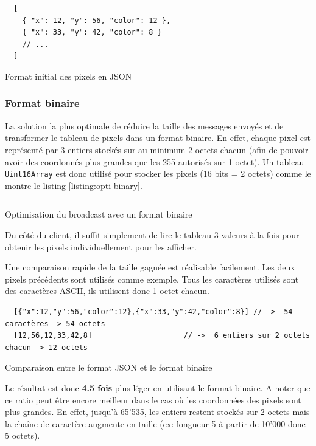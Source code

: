\begin{listing}[H]
  \begin{verbatim}
  [
    { "x": 12, "y": 56, "color": 12 },
    { "x": 33, "y": 42, "color": 8 }
    // ...
  ]
\end{verbatim}
  \caption{Format initial des pixels en JSON}
  \label{listing:pixels-initial-json-format}
\end{listing}

\subsubsection{Format binaire}

La solution la plus optimale de réduire la taille des messages envoyés et de transformer le tableau de pixels dans un format binaire. En effet, chaque pixel est représenté par 3 entiers stockés sur au minimum 2 octets chacun (afin de pouvoir avoir des coordonnés plus grandes que les 255 autorisés sur 1 octet). Un tableau \texttt{Uint16Array} est donc utilisé pour stocker les pixels (16 bits = 2 octets) comme le montre le listing \ref{listing:opti-binary}.

\begin{listing}[H]
  \inputminted[highlightlines={9}, linenos]{ts}{assets/figures/opti-binary.ts}
  \caption{Optimisation du broadcast avec un format binaire}
  \label{listing:opti-binary}
\end{listing}

Du côté du client, il suffit simplement de lire le tableau 3 valeurs à la fois pour obtenir les pixels individuellement pour les afficher.

Une comparaison rapide de la taille gagnée est réalisable facilement. Les deux pixels précédents sont utilisés comme exemple. Tous les caractères utilisés sont des caractères ASCII, ils utilisent donc 1 octet chacun.

\begin{listing}[H]
  \begin{verbatim}
  [{"x":12,"y":56,"color":12},{"x":33,"y":42,"color":8}] // ->  54 caractères -> 54 octets
  [12,56,12,33,42,8]                     // ->  6 entiers sur 2 octets chacun -> 12 octets
\end{verbatim}
  \caption{Comparaison entre le format JSON et le format binaire}
  \label{listing:json-vs-binary}
\end{listing}

Le résultat est donc \textbf{4.5 fois} plus léger en utilisant le format binaire. A noter que ce ratio peut être encore meilleur dans le cas où les coordonnées des pixels sont plus grandes. En effet, jusqu'à 65'535, les entiers restent stockés sur 2 octets mais la chaîne de caractère augmente en taille (ex: longueur 5 à partir de 10'000 donc 5 octets).

